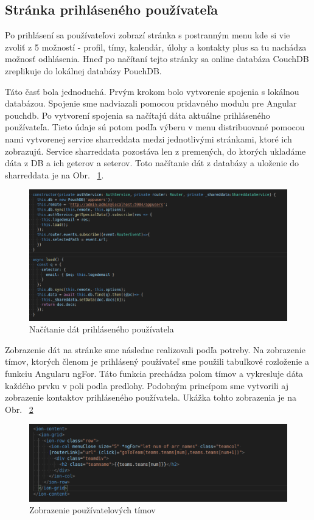 \subsection{Stránka prihláseného používateľa}
\indent Po prihlásení sa používateľovi zobrazí stránka s postranným menu kde si vie zvoliť z 5 možností - profil, tímy, kalendár, úlohy a kontakty plus sa tu nachádza možnosť odhlásenia. Hneď po načítaní tejto stránky sa online databáza CouchDB zreplikuje do lokálnej databázy PouchDB. 

\indent Táto časť bola jednoduchá. Prvým krokom bolo vytvorenie spojenia s lokálnou databázou. Spojenie sme nadviazali pomocou pridavného modulu pre Angular pouchdb. Po vytvorení spojenia sa načítajú dáta aktuálne prihláseného používateľa. Tieto údaje sú potom podľa výberu v menu distribuované pomocou nami vytvorenej service sharreddata medzi jednotlivými stránkami, ktoré ich zobrazujú. Service sharreddata pozostáva len z premených, do ktorých ukladáme dáta z DB a ich geterov a seterov. Toto načítanie dát z databázy a uloženie do sharreddata je na Obr. ~\ref{fig:loged_back}.  

\begin{figure}[H]
    \centering
    \includegraphics[scale=0.38]{img/imp/loged_user_back.png}
    \caption{Načítanie dát prihláseného používatela}
    \label{fig:loged_back}
\end{figure}

\indent Zobrazenie dát na stránke sme následne realizovali podľa potreby. Na zobrazenie tímov, ktorých členom je prihlásený používateľ sme použili tabuľkové rozloženie a funkciu Angularu ngFor. Táto funkcia prechádza polom tímov a vykresluje dáta každého prvku v poli podla predlohy. Podobným princípom sme vytvorili aj zobrazenie kontaktov prihláseného používatela. Ukážka tohto zobrazenia je na Obr. ~\ref{fig:teams}

\begin{figure}[H]
    \centering
    \includegraphics[scale=0.45]{img/imp/teams.png}
    \caption{Zobrazenie používatelových tímov}
    \label{fig:teams}
\end{figure}

